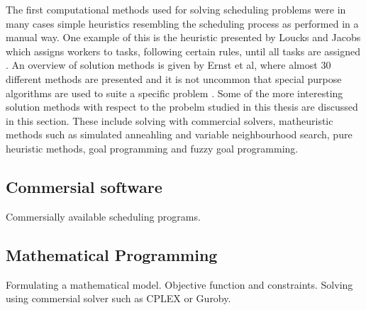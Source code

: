 The first computational methods used for solving scheduling problems were in many cases simple heuristics resembling the scheduling process as performed in a manual way. One example of this is the heuristic presented by Loucks and Jacobs which assigns workers to tasks, following certain rules, until all tasks are assigned \citet{loucks_1991}. An overview of solution methods is given by Ernst et al, where almost 30 different methods are presented  and it is not uncommon that special purpose algorithms are used to suite a specific problem \citet{Ernst_2004}. Some of the more interesting solution methods with respect to the probelm studied in this thesis are discussed in this section. These include solving with commercial solvers, matheuristic methods such as simulated anneahling and variable neighbourhood search, pure heuristic methods, goal programming and fuzzy goal programming.  



\subsection{Commersial software}

Commersially available scheduling programs.

\subsection{Mathematical Programming}

Formulating a mathematical model. Objective function and constraints. Solving using commersial solver such as CPLEX or Guroby.


